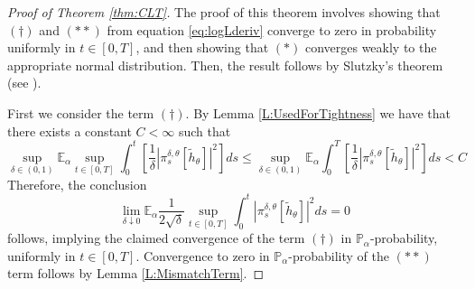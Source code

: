 \documentclass{article}
\begin{document}
\begin{proof} [Proof of Theorem \ref{thm:CLT}] The proof of this theorem involves showing that $(\dagger)$ and $(**)$ from equation \eqref{eq:logLderiv} converge to zero in probability uniformly in $t\in[0,T]$, and then showing that $(*)$ converges weakly to the appropriate normal distribution. Then, the result follows by Slutzky's theorem (see \cite{Billingsley}).


First we consider the term $(\dagger)$. By Lemma \ref{L:UsedForTightness} we have that there exists a constant $C<\infty$ such that
\[
\sup_{\delta\in(0,1)}\mathbb{E}_{\alpha}\sup_{t\in[0,T]}\int_{0}^{t}\left[\frac{1}{\delta}\left|\pi_s^{\delta,\theta}[\tilde h_{\theta}]\right|^{2}\right]ds
\leq\sup_{\delta\in(0,1)}\mathbb{E}_{\alpha}\int_{0}^{T}\left[\frac{1}{\delta}\left|\pi_s^{\delta,\theta}[\tilde h_{\theta}]\right|^{2}\right]ds<C
\]
Therefore, the conclusion
\[
\lim_{\delta\downarrow 0}\mathbb{E}_{\alpha}\frac{1}{2\sqrt\delta}\sup_{t\in[0,T]}\int_0^t\left| \pi_s^{\delta,\theta}[\tilde h_{\theta}]\right|^2ds=0
\]
follows, implying the claimed convergence of the term  $(\dagger)$ in $\mathbb{P}_{\alpha}$-probability, uniformly in $t\in[0,T]$. Convergence to zero in $\mathbb{P}_{\alpha}$-probability of the $(**)$ term follows by Lemma \ref{L:MismatchTerm}.


\end{proof}
\end{document}
